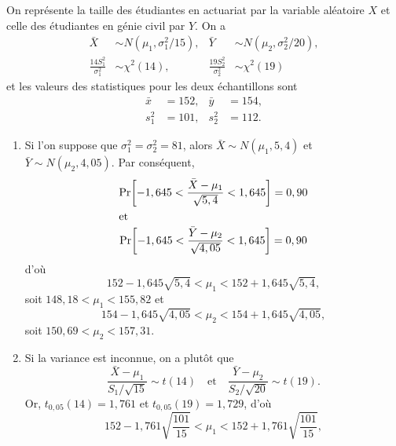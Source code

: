 \begin{solution}{5.5}
    On représente la taille des étudiantes en actuariat par la
    variable aléatoire $X$ et celle des étudiantes en génie civil par
    $Y$. On a
    \begin{align*}
      \bar{X} &\sim N(\mu_1, \sigma_1^2/15), &
      \bar{Y} &\sim N(\mu_2, \sigma_2^2/20), \\
      \frac{14 S_1^2}{\sigma_1^2} &\sim \chi^2(14), &
      \frac{19 S_2^2}{\sigma_2^2} &\sim \chi^2(19)
    \end{align*}
    et les valeurs des statistiques pour les deux échantillons sont
    \begin{align*}
      \bar{x} &= 152, & \bar{y} &= 154, \\
      s_1^2   &= 101, &  s_2^2  &= 112.
    \end{align*}
    \begin{enumerate}
    \item Si l'on suppose que $\sigma_1^2 = \sigma_2^2 = 81$, alors
      $\bar{X} \sim N(\mu_1, 5,4)$ et $\bar{Y} \sim N(\mu_2, 4,05)$.
      Par conséquent,
      \begin{gather*}
        \mathrm{Pr}\! \left[ -1,645
          < \frac{\bar{X} - \mu_1}{\sqrt{5,4}} <
          1,645 \right] = 0,90 \\
        \intertext{et}
        \mathrm{Pr}\! \left[ -1,645
          < \frac{\bar{Y} - \mu_2}{\sqrt{4,05}} <
          1,645
         \right] = 0,90
      \end{gather*}
      d'où
      \begin{equation*}
        152 - 1,645 \sqrt{5,4} < \mu_1 < 152 + 1,645 \sqrt{5,4},
      \end{equation*}
      soit $148,18 < \mu_1 < 155,82$ et
      \begin{equation*}
        154 - 1,645 \sqrt{4,05} < \mu_2 < 154 + 1,645 \sqrt{4,05},
      \end{equation*}
      soit $150,69 < \mu_2 < 157,31$.
    \item Si la variance est inconnue, on a plutôt que
      \begin{equation*}
        \frac{\bar{X} - \mu_1}{S_1/\sqrt{15}} \sim t(14)
        \quad \text{et} \quad
        \frac{\bar{Y} - \mu_2}{S_2/\sqrt{20}} \sim t(19).
      \end{equation*}
      Or, $t_{0,05}(14) = 1,761$ et $t_{0,05}(19) =
      1,729$, d'où
      \begin{equation*}
        152 - 1,761 \sqrt{\frac{101}{15}} < \mu_1 < 152 + 1,761
        \sqrt{\frac{101}{15}},
      \end{equation*}

\end{enumerate}
\end{solution}
